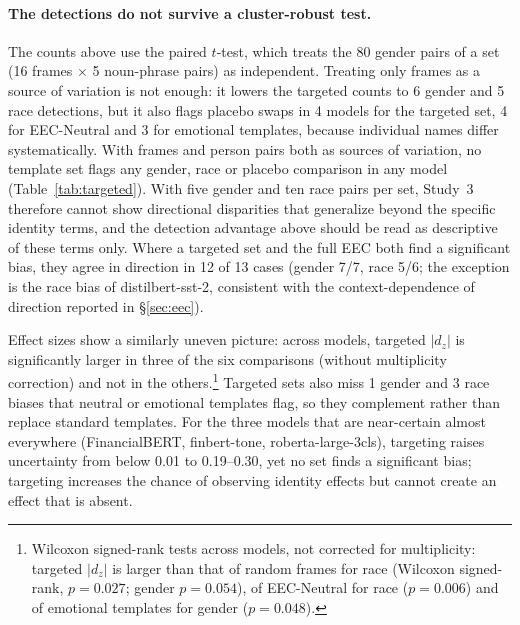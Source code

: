 \documentclass[runningheads]{llncs}
\begin{document}
\paragraph{The detections do not survive a cluster-robust test.} The counts
above use the paired $t$-test, which treats the 80 gender pairs of a set (16
frames $\times$ 5 noun-phrase pairs) as independent. Treating only frames as a
source of variation is not enough: it lowers the targeted counts to 6 gender
and 5 race detections, but it also flags placebo swaps in 4 models for the
targeted set, 4 for EEC-Neutral and 3 for emotional templates, because
individual names differ systematically. With frames and person pairs both as
sources of variation, no template set flags any gender, race or placebo
comparison in any model (Table~\ref{tab:targeted}). With five gender and ten
race pairs per set, Study~3 therefore cannot show directional disparities that
generalize beyond the specific identity terms, and the detection advantage
above should be read as descriptive of these terms only. Where a targeted set and the full EEC both find a significant bias,
they agree in direction in 12 of 13 cases (gender 7/7, race 5/6; the exception
is the race bias of distilbert-sst-2, consistent with the context-dependence of
direction reported in \S\ref{sec:eec}).

Effect sizes show a similarly uneven picture: across models, targeted $|d_z|$
is significantly larger in three of the six comparisons (without multiplicity
correction) and not in the others.\footnote{Wilcoxon signed-rank tests across models, not corrected for
multiplicity: targeted $|d_z|$ is larger than that of random frames for race
(Wilcoxon signed-rank, $p=0.027$; gender $p=0.054$), of EEC-Neutral for race
($p=0.006$) and of emotional templates for gender ($p=0.048$).} Targeted sets also miss 1 gender and 3 race biases
that neutral or emotional templates flag, so they complement rather than
replace standard templates. For the three models that are near-certain almost
everywhere (FinancialBERT, finbert-tone, roberta-large-3cls), targeting raises
uncertainty from below 0.01 to 0.19--0.30, yet no set finds a significant bias;
targeting increases the chance of observing identity effects but cannot create
an effect that is absent.
\end{document}
